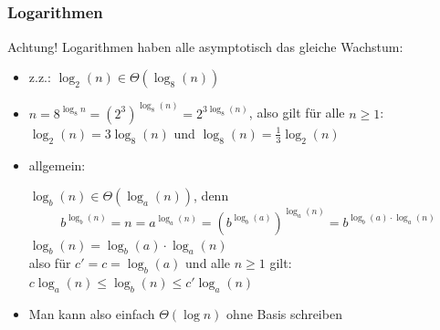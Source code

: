 \subsection*{}
\begin{frame}
  \frametitle{Logarithmen}
    \begin{block}{Achtung!}
  		Logarithmen haben alle asymptotisch das gleiche Wachstum: \pause
  \begin{itemize}
  	\item z.z.: $\log_2(n) \in\Theta(\log_8(n))$ \pause
	\item $n = 8^{\log_8 n} = (2^3)^{\log_8(n)} = 2^{3\log_8(n)}$,
		also gilt für alle $n\geq 1$: $\log_2(n) = 3 \log_8(n)$ und $\log_8(n)=\frac{1}{3}\log_2(n)$
	\item allgemein: \pause

 	 $\log_b(n) \in\Theta(\log_a(n))$, denn
	    \[
	    b^{\log_b(n)} = n = a^{\log_a(n)} = (b^{\log_b(a)})^{\log_a(n)} = b^{\log_b(a) \cdot \log_a(n) }
	    \]  \pause
	     $\log_b(n) = \log_b(a) \cdot \log_a(n)$ \\
	    also für $c'=c=\log_b(a)$ und alle $n\geq 1$ gilt: $c \log_a(n) \leq\log_b(n) \leq c' \log_a(n) $ \pause
	 \item Man kann also einfach $\Theta(\log n)$ ohne Basis schreiben
  \end{itemize}
  \end{block}
\end{frame}

